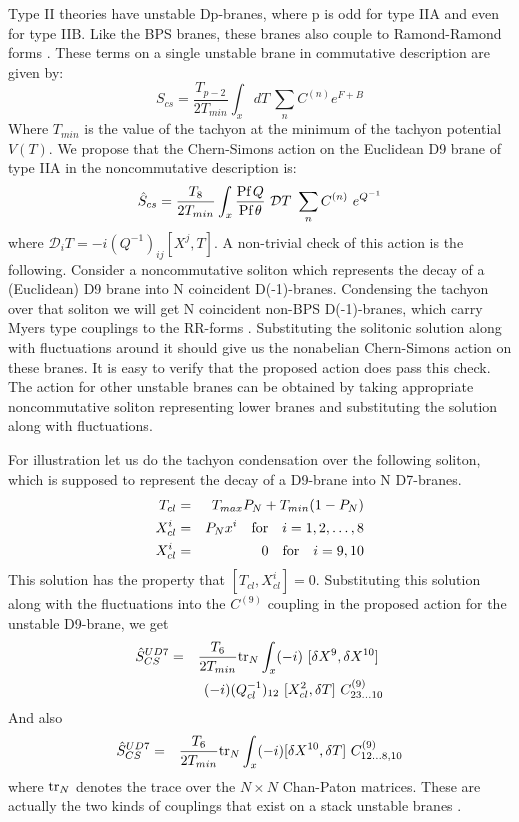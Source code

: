 \documentclass[a4paper,a4paper]{amsproc}
\theoremstyle{definition}
\theoremstyle{remark}
\numberwithin{equation}{section}
\begin{document}
Type II theories have unstable Dp-branes, where p is odd for type IIA
and even for type IIB. Like the BPS branes, these branes also couple
to Ramond-Ramond forms \cite{sencs, billo, kennedy}. These terms on a
single unstable brane in commutative description are given by:
%
\begin{equation}
S_{cs} = {\frac{T_{p-2}}{2T_{min}}}\int_x 
dT~\sum_n C^{(n)} e^{F+B}
\end{equation}
%
Where $T_{min}$ is the value of the tachyon at the minimum of the
tachyon potential $V(T)$. We propose that the Chern-Simons action on
the Euclidean D9 brane of type IIA in the noncommutative description
is:
%
\begin{equation}
\hat{S}_{cs} = \frac{T_{8}}{2T_{min}}\int_x \frac{\hbox{Pf}\,
Q}{\hbox{Pf}\, \theta} ~{\mathcal{D}}T~ \sum_n C^{(n)}~e^{Q^{-1}}
\end{equation}
%
where ${\mathcal{D}}_i T = -i (Q^{-1})_{ij}[X^j, T]$. A non-trivial
check of this action is the following. Consider a noncommutative
soliton which represents the decay of a (Euclidean) D9 brane into N
coincident D(-1)-branes. Condensing the tachyon over that soliton we
will get N coincident non-BPS D(-1)-branes, which carry Myers type
couplings to the RR-forms \cite{twosens}. Substituting the solitonic
solution along with fluctuations around it should give us the
nonabelian Chern-Simons action on these branes. It is easy to verify
that the proposed action does pass this check. The action for other
unstable branes can be obtained by taking appropriate noncommutative
soliton representing lower branes and substituting the solution along
with fluctuations.

For illustration let us do the tachyon condensation over the following
soliton, which is supposed to represent the decay of a D9-brane into N
D7-branes.
%
\begin{eqnarray}
T_{cl} &=& T_{max} P_N + T_{min}(1-P_N)\cr
X^i_{cl} &=& P_N x^i\quad {\rm for}\quad i= 1,2,\ldots,8\cr
X^i_{cl} &=& 0 \quad {\rm for}\quad i= 9,10\cr
\end{eqnarray}
%
This solution has the property that $[T_{cl}, X^{i}_{cl}]
=0$. Substituting this solution along with the fluctuations into the
$C^{(9)}$ coupling in the proposed action for the unstable D9-brane,
we get
%
\begin{eqnarray}
\hat{S}^{UD7}_{CS} &=& \frac{T_{6}}{2T_{min}}{\hbox{tr}}_N 
\int_x (-i)~[\delta X^9, \delta X^{10}]~ \cr
&&(-i)(Q_{cl}^{-1})_{12}
~[X^2_{cl},\delta T]~ C^{(9)}_{2 3 \ldots 10}
\end{eqnarray}
%
And also
%
\begin{eqnarray}
\hat{S}^{UD7}_{CS} &=& \frac{T_{6}}{2T_{min}}{\hbox{tr}}_N\int_x 
(-i)[\delta X^{10},\delta T]~ C^{(9)}_{12\ldots 8,10}\cr
\end{eqnarray} 
%
where $\hbox{tr}_N$ denotes the trace over the $N\times N$ Chan-Paton
matrices. These are actually the two kinds of couplings that exist on
a stack unstable branes \cite{twosens}.
\end{document}

